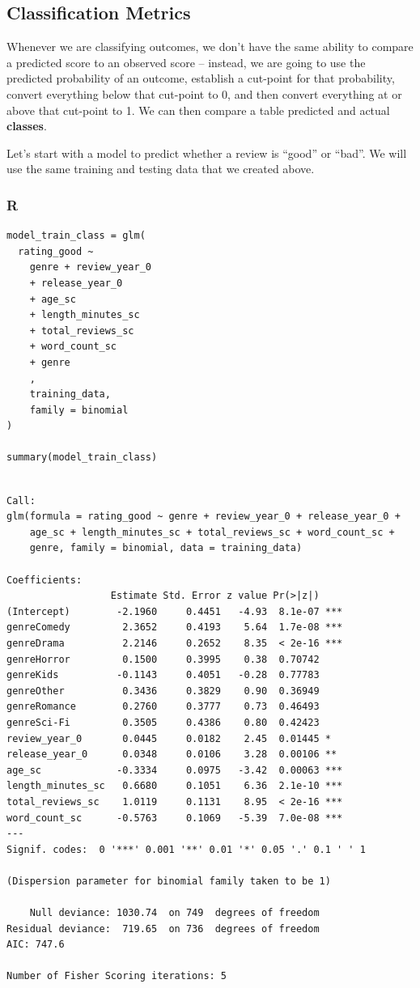 \documentclass[
  letterpaper,
]{krantz}
\begin{document}
\subsection{Classification Metrics}\label{sec-knowing-class-metrics}

Whenever we are classifying outcomes, we don't have the same ability to
compare a predicted score to an observed score -- instead, we are going
to use the predicted probability of an outcome, establish a cut-point
for that probability, convert everything below that cut-point to 0, and
then convert everything at or above that cut-point to 1. We can then
compare a table predicted and actual \textbf{classes}.

Let's start with a model to predict whether a review is ``good'' or
``bad''. We will use the same training and testing data that we created
above.

\subsubsection{R}

\begin{verbatim}
model_train_class = glm(
  rating_good ~ 
    genre + review_year_0 
    + release_year_0 
    + age_sc 
    + length_minutes_sc 
    + total_reviews_sc 
    + word_count_sc 
    + genre     
    , 
    training_data, 
    family = binomial
)

summary(model_train_class)
\end{verbatim}

\begin{verbatim}

Call:
glm(formula = rating_good ~ genre + review_year_0 + release_year_0 + 
    age_sc + length_minutes_sc + total_reviews_sc + word_count_sc + 
    genre, family = binomial, data = training_data)

Coefficients:
                  Estimate Std. Error z value Pr(>|z|)    
(Intercept)        -2.1960     0.4451   -4.93  8.1e-07 ***
genreComedy         2.3652     0.4193    5.64  1.7e-08 ***
genreDrama          2.2146     0.2652    8.35  < 2e-16 ***
genreHorror         0.1500     0.3995    0.38  0.70742    
genreKids          -0.1143     0.4051   -0.28  0.77783    
genreOther          0.3436     0.3829    0.90  0.36949    
genreRomance        0.2760     0.3777    0.73  0.46493    
genreSci-Fi         0.3505     0.4386    0.80  0.42423    
review_year_0       0.0445     0.0182    2.45  0.01445 *  
release_year_0      0.0348     0.0106    3.28  0.00106 ** 
age_sc             -0.3334     0.0975   -3.42  0.00063 ***
length_minutes_sc   0.6680     0.1051    6.36  2.1e-10 ***
total_reviews_sc    1.0119     0.1131    8.95  < 2e-16 ***
word_count_sc      -0.5763     0.1069   -5.39  7.0e-08 ***
---
Signif. codes:  0 '***' 0.001 '**' 0.01 '*' 0.05 '.' 0.1 ' ' 1

(Dispersion parameter for binomial family taken to be 1)

    Null deviance: 1030.74  on 749  degrees of freedom
Residual deviance:  719.65  on 736  degrees of freedom
AIC: 747.6

Number of Fisher Scoring iterations: 5
\end{verbatim}
\end{document}
